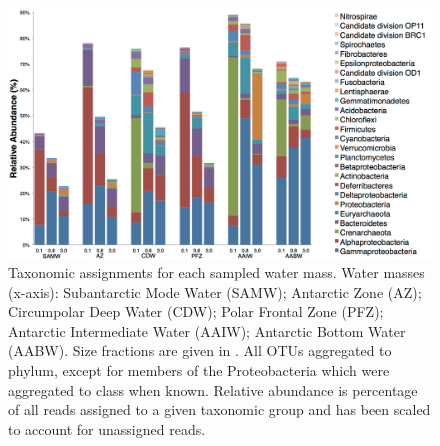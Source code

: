 \begin{figure}[!ht]
  \centering
  \includegraphics[width=\textwidth]{../advection/taxonomicbarplot.png}
  \caption[OTU assignments in the advection study.]{Taxonomic assignments for each sampled water mass. Water masses (x-axis): Subantarctic Mode Water (SAMW); Antarctic Zone (AZ); Circumpolar Deep Water (CDW); Polar Frontal Zone (PFZ); Antarctic Intermediate Water (AAIW); Antarctic Bottom Water (AABW). Size fractions are given in \micron{}. All \acp{OTU} aggregated to phylum, except for members of the Proteobacteria which were aggregated to class when known. Relative abundance is percentage of all reads assigned to a given taxonomic group and has been scaled to account for unassigned reads.}
  \label{fig:taxonomicbarplot}
\end{figure}

